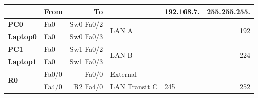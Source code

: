 \documentclass[11pt,a4paper]{report}
\begin{document}
\begin{longtable}[c]{llrllrr}
            \multicolumn{1}{c}{}                               & \textbf{From}                & \textbf{To}               & \multicolumn{1}{c}{}                                  & \multicolumn{2}{c}{192.168.7.}                                                                           & \multicolumn{1}{c}{255.255.255.}                          \\ \hline
            \endhead
            \hline
            \endfoot
            \endlastfoot
            \textbf{PC0}                                       & Fa0                          & Sw0 Fa0/2                 & \multirow{2}{*}{LAN A}                                & \multicolumn{2}{l}{\multirow{2}{*}{}}                                                                    & \multirow{2}{*}{192}                                      \\
            \textbf{Laptop0}                                   & Fa0                          & Sw0 Fa0/3                 &                                                       & \multicolumn{2}{l}{}                                                                                     &                                                           \\ \hline
            \textbf{PC1}                                       & Fa0                          & Sw1 Fa0/2                 & \multirow{2}{*}{LAN B}                                & \multicolumn{2}{l}{\multirow{2}{*}{}}                                                                    & \multirow{2}{*}{224}                                      \\
            \textbf{Laptop1}                                   & Fa0                          & Sw1 Fa0/3                 &                                                       & \multicolumn{2}{l}{}                                                                                     &                                                           \\ \hline
            \multirow{3}{*}{\textbf{R0}}                       & Fa0/0                        & Fa0/0                     & External                                              &                                                  &                                                       & \multicolumn{1}{l}{}                                      \\ \cline{5-7}
                                                               & Fa4/0                        & R2 Fa4/0                  & LAN Transit C                                         & 245                                              &                                                       & \multirow{2}{*}{252}                                      \\

\end{longtable}
\end{document}
